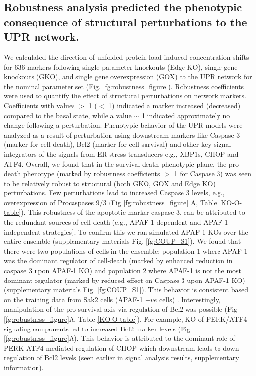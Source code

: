 \documentclass[fleqn,10pt]{wlscirep}
\begin{document}
\subsection*{Robustness analysis predicted the phenotypic consequence of structural perturbations to the UPR network.}
We calculated the direction of unfolded protein load induced concentration shifts for 636 markers following single parameter knockouts (Edge KO), single gene knockouts (GKO), and single gene overexpression (GOX) to the UPR network for the nominal parameter set (Fig. \ref{fg:robustness_figure}).
Robustness coefficients were used to quantify the effect of structural perturbations on network markers.
Coefficients with values $>$ 1 ($<$ 1) indicated a marker increased (decreased) compared to the basal state, while a value $\sim$ 1 indicated approximately no change following a perturbation.
Phenotypic behavior of the UPR models were analyzed as a result of perturbation using downstream markers like Caspase 3 (marker for cell death), Bcl2 (marker for cell-survival) and other key signal integrators of the signals from ER stress transducers e.g., XBP1s, CHOP and ATF4.
Overall, we found that in the survival-death phenotypic plane, the pro-death phenotype (marked by robustness coefficients $>$ 1 for Caspase 3) was seen to be relatively robust to structural (both GKO, GOX and Edge KO) perturbations.
Few perturbations lead to increased Caspase 3 levels, e.g., overexpression of Procaspases 9/3 (Fig \ref{fg:robustness_figure} A, Table \ref{KO-O-table}).
This robustness of the apoptotic marker caspase 3, can be attributed to the redundant sources of cell death (e.g., APAF-1 dependent and APAF-1 independent strategies).
To confirm this we ran simulated APAF-1 KOs over the entire ensemble (supplementary materials Fig. \ref{fg:COUP_S1}). We found that there were two populations of cells in the ensemble: population 1 where APAF-1 was the dominant regulator of cell-death (marked by enhanced reduction in caspase 3 upon APAF-1 KO) and population 2 where APAF-1 is not the most dominant regulator (marked by reduced effect on Caspase 3 upon APAF-1 KO) (supplementary materials Fig. \ref{fg:COUP_S1}).
This behavior is consistent based on the training data from Sak2 cells (APAF-1 $-ve$ cells) \cite{rao2002cer}.
Interestingly, manipulation of the pro-survival axis via regulation of Bcl2 was possible (Fig \ref{fg:robustness_figure}A, Table \ref{KO-O-table}).
For example, KO of PERK/ATF4 signaling components led to increased Bcl2 marker levels (Fig \ref{fg:robustness_figure}A).
This behavior is attributed to the dominant role of PERK-ATF4 mediated regulation of CHOP which downstream leads to down-regulation of Bcl2 levels (seen earlier in signal analysis results, supplementary information).
\end{document}
